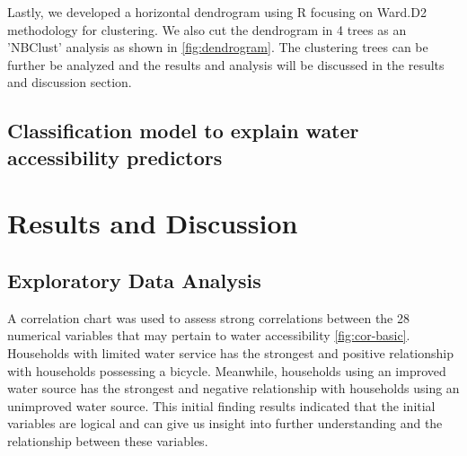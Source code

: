 \documentclass[10pt,twoside]{article}
\numberwithin{equation}{section}
\newcommand{\?}{\stackrel{?}{=}}
\begin{document}
Lastly, we developed a horizontal dendrogram using R focusing on Ward.D2 methodology for clustering. We also cut the dendrogram in 4 trees as an 'NBClust' analysis as shown in \autoref{fig:dendrogram}. The clustering trees can be further be analyzed and the results and analysis will be discussed in the results and discussion section. 



\subsection{Classification model to explain water accessibility predictors}


\section{Results and Discussion}

\subsection{Exploratory Data Analysis}
A correlation chart was used to assess strong correlations between the 28 numerical variables that may pertain to water accessibility \autoref{fig:cor-basic}. Households with limited water service has the strongest and positive relationship with households possessing a bicycle. Meanwhile, households using an improved water source has the strongest and negative relationship with households using an unimproved water source. This initial finding results indicated that the initial variables are logical and can give us insight into further understanding and the relationship between these variables. 
\end{document}
